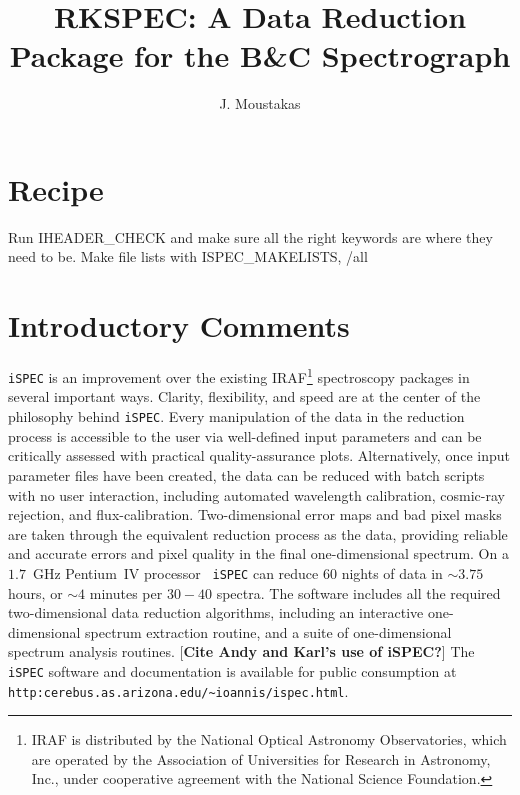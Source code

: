 \documentclass[12pt,preprint]{aastex}
\begin{document}
\pagestyle{plain}

\title{RKSPEC: A Data Reduction Package for the B\&C Spectrograph}
\author{J. Moustakas}

\section{Recipe}

Run IHEADER_CHECK and make sure all the right keywords are where they
need to be.  Make file lists with ISPEC_MAKELISTS, /all




\section{Introductory Comments}\label{sec:intro}

{\tt iSPEC} is an improvement over the existing IRAF\footnote{IRAF is
distributed by the National Optical Astronomy Observatories, which are
operated by the Association of Universities for Research in Astronomy,
Inc., under cooperative agreement with the National Science
Foundation.} spectroscopy packages in several important ways.
Clarity, flexibility, and speed are at the center of the philosophy
behind {\tt iSPEC}.  Every manipulation of the data in the reduction
process is accessible to the user via well-defined input parameters
and can be critically assessed with practical quality-assurance plots.
Alternatively, once input parameter files have been created, the data
can be reduced with batch scripts with no user interaction, including
automated wavelength calibration, cosmic-ray rejection, and
flux-calibration.  Two-dimensional error maps and bad pixel masks are
taken through the equivalent reduction process as the data, providing
reliable and accurate errors and pixel quality in the final
one-dimensional spectrum.  On a $1.7$~GHz Pentium~IV processor {\tt
iSPEC} can reduce $60$ nights of data in $\sim3.75$ hours, or $\sim4$
minutes per $30-40$ spectra.  The software includes all the required
two-dimensional data reduction algorithms, including an interactive
one-dimensional spectrum extraction routine, and a suite of
one-dimensional spectrum analysis routines.  [{\bf Cite Andy and
Karl's use of iSPEC?}]  The {\tt iSPEC} software and documentation is
available for public consumption at {\tt
http:cerebus.as.arizona.edu/\~{}ioannis/ispec.html}.
\end{document}
